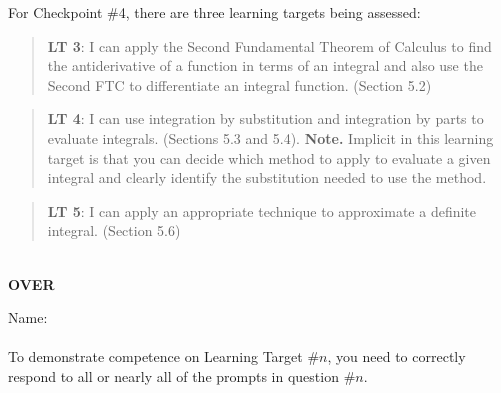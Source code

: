 \documentclass[11 pt]{article}
\begin{document}
 For Checkpoint \#4, there are three learning targets being assessed: 

\begin{quote}
{\bf LT 3}: I can apply the Second Fundamental Theorem of Calculus to find the antiderivative of a function in terms of an integral and also use the Second FTC to differentiate an integral function. (Section 5.2)
\end{quote}

\begin{quote}
{\bf LT 4}: I can use integration by substitution and integration by parts to evaluate integrals. (Sections 5.3 and 5.4). {\bf Note.} Implicit in this learning target is that you can decide which method to apply to evaluate a given integral and clearly identify the substitution needed to use the method.
\end{quote}

\begin{quote}
{\bf LT 5}: I can apply an appropriate technique to approximate a definite integral. (Section 5.6)
\end{quote}

\noindent \hrulefill \\

\vfill \hfill {\bf OVER} 

\pagebreak

\noindent Name: \\ \ \\

\noindent To demonstrate competence on Learning Target \#$n$, you need to correctly respond to all or nearly all of the prompts in question \#$n$.  
\end{document}
